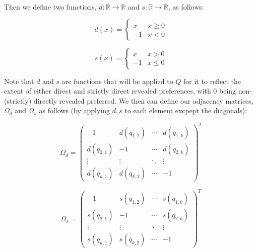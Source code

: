 \documentclass{article} %
\begin{document}
Then we define two functions, $d:\mathbb{R}\to\mathbb{R}$ and $s:\mathbb{R}\to\mathbb{R}$, as follows:

\begin{minipage}{.5\linewidth}
\[ 
d(x)=
 \begin{cases} 
   x & x\geq0 \\
    -1 & x<0
 \end{cases}
\]
\end{minipage}
\begin{minipage}{.5\linewidth}
\[
s(x)=
    \begin{cases} 
      x & x>0 \\
      -1 & x\leq0
   \end{cases}
\]
\end{minipage}

Note that $d$ and $s$ are functions that will be applied to $Q$ for it to reflect the extent of either direct and strictly direct revealed preferences, with 0 being non-(strictly) directly revealed preferred. We then can define our adjacency matrices, $\Omega_d$ and $\Omega_s$ as follows (by applying $d,s$ to each element excpept the diagonals):

\[
\Omega_d =
  \begin{pmatrix}
  -1 & d(q_{1,2}) & \cdots & d(q_{1,k}) \\
    d(q_{2,1}) & -1 & \cdots & d(q_{2,k}) \\
    \vdots & \vdots & \ddots & \vdots \\
    d(q_{k,1}) & d(q_{k,2}) & \cdots & -1
  \end{pmatrix}^T
\]

\[
\Omega_s =
  \begin{pmatrix}
  -1 & s(q_{1,2}) & \cdots & s(q_{1,k}) \\
    s(q_{2,1}) & -1 & \cdots & s(q_{2,k}) \\
    \vdots & \vdots & \ddots & \vdots \\
    s(q_{k,1}) & s(q_{k,2}) & \cdots & -1
  \end{pmatrix} ^T
\]
\end{document}
